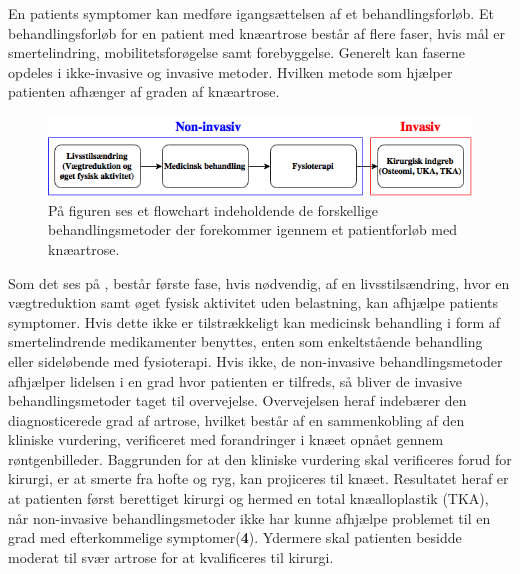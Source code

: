 En patients symptomer kan medføre igangsættelsen af et behandlingsforløb. Et behandlingsforløb for en patient med knæartrose består af flere faser, hvis mål er smertelindring, mobilitetsforøgelse samt forebyggelse. Generelt kan faserne opdeles i ikke-invasive og invasive metoder. Hvilken metode som hjælper patienten afhænger af graden af knæartrose.

\begin{figure}[H]
	\centering
	\includegraphics[width=1\textwidth]{figures/bProblemanalyse/flowchart_behandlingsforloeb.png}
	\caption{På figuren ses et flowchart indeholdende de forskellige behandlingsmetoder der forekommer igennem et patientforløb med knæartrose.}
	\label{fig:flow_behandlingsfaser}
\end{figure}\vspace{-.25cm}

Som det ses på , består første fase, hvis nødvendig, af en livsstilsændring, hvor en vægtreduktion samt øget fysisk aktivitet uden belastning, kan afhjælpe patients symptomer. Hvis dette ikke er tilstrækkeligt kan medicinsk behandling i form af smertelindrende medikamenter benyttes, enten som enkeltstående behandling eller sideløbende med fysioterapi. Hvis ikke, de non-invasive behandlingsmetoder afhjælper lidelsen i en grad hvor patienten er tilfreds, så bliver de invasive behandlingsmetoder taget til overvejelse. Overvejelsen heraf indebærer den diagnosticerede grad af artrose, hvilket består af en sammenkobling af den kliniske vurdering, verificeret med forandringer i knæet opnået gennem røntgenbilleder. Baggrunden for at den kliniske vurdering skal verificeres forud for kirurgi, er at smerte fra hofte og ryg, kan projiceres til knæet. Resultatet heraf er at patienten først berettiget kirurgi og hermed en total knæalloplastik (TKA), når non-invasive behandlingsmetoder ikke har kunne afhjælpe problemet til en grad med efterkommelige symptomer(\textbf{4}). Ydermere skal patienten besidde moderat til svær artrose for at kvalificeres til kirurgi. \citep{Lind2016b} \citep{brostrom2012} \citep{skou2016}

